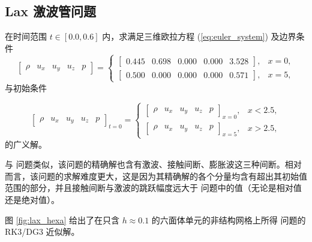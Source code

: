 \subsection{Lax 激波管问题}
\begin{problem}
\label{prob:Lax-=006FC0=006CE2=007BA1}在时间范围 $t\in[0.0,0.6]$
内，求满足三维欧拉方程 (\ref{eq:euler_system}) 及边界条件
\begin{equation}
\begin{bmatrix}\rho & u_{x} & u_{y} & u_{z} & p\end{bmatrix}=\begin{cases}
\begin{bmatrix}0.445 & 0.698 & 0.000 & 0.000 & 3.528\end{bmatrix}, & x=0,\\
\begin{bmatrix}0.500 & 0.000 & 0.000 & 0.000 & 0.571\end{bmatrix}, & x=5,
\end{cases}
\end{equation}
与初始条件

\begin{equation}
\begin{bmatrix}\rho & u_{x} & u_{y} & u_{z} & p\end{bmatrix}_{t=0}=\begin{cases}
\begin{bmatrix}\rho & u_{x} & u_{y} & u_{z} & p\end{bmatrix}_{x=0}, & x<2.5,\\
\begin{bmatrix}\rho & u_{x} & u_{y} & u_{z} & p\end{bmatrix}_{x=5}, & x>2.5,
\end{cases}
\end{equation}
的广义解。
\end{problem}

与 问题类似，该问题的精确解也含有激波、接触间断、膨胀波这三种间断。相对而言，该问题的求解难度更大，这是因为其精确解的各个分量均含有超出其初始值范围的部分，并且接触间断与激波的跳跃幅度远大于
问题中的值（无论是相对值还是绝对值）。

图 \ref{fig:lax_hexa} 给出了在只含 $h\approx0.1$ 的六面体单元的非结构网格上所得 问题的
RK3/DG3 近似解。

